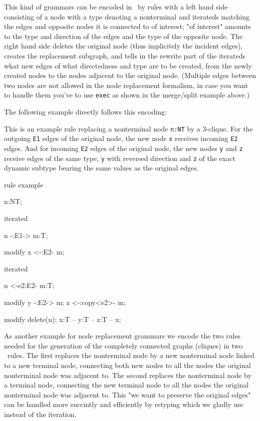This kind of grammars can be encoded in \GrG~by rules with a left hand side consisting of a node with a type denoting a nonterminal and iterateds matching the edges and opposite nodes it is connected to of interest; "of interest" amounts to the type and direction of the edges and the type of the opposite node. The right hand side deletes the original node (thus implicitely the incident edges), creates the replacement subgraph, and tells in the rewrite part of the iterateds what new edges of what directedness and type are to be created, from the newly created nodes to the nodes adjacent to the original node. (Multiple edges between two nodes are not allowed in the node replacement formalism, in case you want to handle them you've to use \texttt{exec} as shown in the merge/split example above.)

The following example directly follows this encoding:

  \begin{example}
This is an example rule replacing a nonterminal node \texttt{n:NT} by a 3-clique.
For the outgoing \texttt{E1} edges of the original node, the new node \texttt{x} receives incoming \texttt{E2} edges.
And for incoming \texttt{E2} edges of the original node, the new nodes \texttt{y} and \texttt{z} receive edges of the same type, \texttt{y} with reversed direction and \texttt{z} of the exact dynamic subtype bearing the same values as the original edges.
    \begin{grgen}
rule example
{
  n:NT;

  iterated {
    n -:E1-> m:T;

    modify {
      x <-:E2- m;
    }
  }

  iterated {
    n <-e2:E2- m:T;

    modify {
      y -:E2-> m;
      z <-:copy<e2>- m;
    }
  }

  modify {
    delete(n);
    x:T -- y:T -- z:T -- x;
  }
}
    \end{grgen}
  \end{example}

As another example for node replacement grammars we encode the two rules needed for the generation of the completely connected graphs (cliques) in two \GrG~rules. The first replaces the nonterminal node by a new nonterminal node linked to a new terminal node, connecting both new nodes to all the nodes the original nonterminal node was adjacent to. The second replaces the nonterminal node by a terminal node, connecting the new terminal node to all the nodes the original nonterminal node was adjacent to. This "we want to preserve the original edges" can be handled more succintly and efficiently by retyping which we gladly use instead of the iteration.


